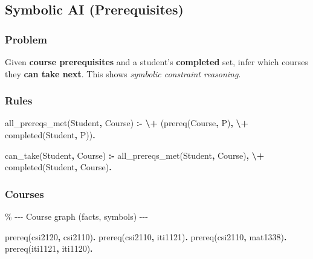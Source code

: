 \documentclass[
  letterpaper,
  DIV=11,
  numbers=noendperiod]{scrartcl}
\newenvironment{Shaded}{\begin{snugshade}}{\end{snugshade}}
\newcommand{\CommentTok}[1]{\textcolor[rgb]{0.37,0.37,0.37}{#1}}
\newcommand{\DataTypeTok}[1]{\textcolor[rgb]{0.68,0.00,0.00}{#1}}
\newcommand{\KeywordTok}[1]{\textcolor[rgb]{0.00,0.23,0.31}{\textbf{#1}}}
\newcommand{\NormalTok}[1]{\textcolor[rgb]{0.00,0.23,0.31}{#1}}
\begin{document}
\subsection{Symbolic AI
(Prerequisites)}\label{symbolic-ai-prerequisites}

\subsubsection{Problem}\label{problem-2}

Given \textbf{course prerequisites} and a student's \textbf{completed}
set, infer which courses they \textbf{can take next}. This shows
\emph{symbolic constraint reasoning}.

\subsubsection{Rules}\label{rules-2}

\begin{Shaded}
\begin{Highlighting}[]
\NormalTok{all\_prereqs\_met(}\DataTypeTok{Student}\KeywordTok{,} \DataTypeTok{Course}\NormalTok{) }\KeywordTok{:{-}}
    \KeywordTok{\textbackslash{}+}\NormalTok{ (prereq(}\DataTypeTok{Course}\KeywordTok{,} \DataTypeTok{P}\NormalTok{)}\KeywordTok{,} \KeywordTok{\textbackslash{}+}\NormalTok{ completed(}\DataTypeTok{Student}\KeywordTok{,} \DataTypeTok{P}\NormalTok{))}\KeywordTok{.}

\NormalTok{can\_take(}\DataTypeTok{Student}\KeywordTok{,} \DataTypeTok{Course}\NormalTok{) }\KeywordTok{:{-}}
\NormalTok{    all\_prereqs\_met(}\DataTypeTok{Student}\KeywordTok{,} \DataTypeTok{Course}\NormalTok{)}\KeywordTok{,}
    \KeywordTok{\textbackslash{}+}\NormalTok{ completed(}\DataTypeTok{Student}\KeywordTok{,} \DataTypeTok{Course}\NormalTok{)}\KeywordTok{.}
\end{Highlighting}
\end{Shaded}

\subsubsection{Courses}\label{courses}

\begin{Shaded}
\begin{Highlighting}[]
\CommentTok{\% {-}{-}{-} Course graph (facts, symbols) {-}{-}{-}}

\NormalTok{prereq(csi2120}\KeywordTok{,}\NormalTok{ csi2110)}\KeywordTok{.}
\NormalTok{prereq(csi2110}\KeywordTok{,}\NormalTok{ iti1121)}\KeywordTok{.}
\NormalTok{prereq(csi2110}\KeywordTok{,}\NormalTok{ mat1338)}\KeywordTok{.}
\NormalTok{prereq(iti1121}\KeywordTok{,}\NormalTok{ iti1120)}\KeywordTok{.}
\end{Highlighting}
\end{Shaded}
\end{document}
